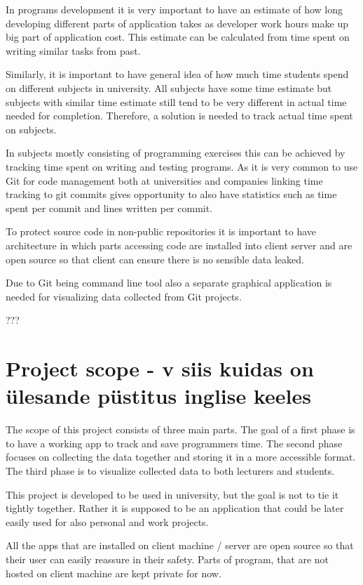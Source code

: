 In programs development it is very important to have an estimate of how long developing different parts of application takes as
developer work hours make up big part of application cost.
This estimate can be calculated from time spent on writing similar tasks from past.

Similarly, it is important to have general idea of how much time students spend on different subjects in university.
All subjects have some time estimate but subjects with similar time estimate still tend to be very different in actual
time needed for completion.
Therefore, a solution is needed to track actual time spent on subjects.

In subjects mostly consisting of programming exercises this can be achieved by tracking time spent on writing and testing programs.
As it is very common to use Git for code management both at universities and companies linking time tracking to git commits
gives opportunity to also have statistics such as time spent per commit and lines written per commit.

To protect source code in non-public repositories it is important to have architecture in which parts accessing code are
installed into client server and are open source so that client can ensure there is no sensible data leaked.

Due to Git being command line tool also a separate graphical application is needed for visualizing data collected
from Git projects.

???

\section{Project scope - v siis kuidas on ülesande püstitus inglise keeles}\label{sec:project-scope}
The scope of this project consists of three main parts.
The goal of a first phase is to have a working app to track and save programmers time.
The second phase focuses on collecting the data together and storing it in a more accessible format.
The third phase is to visualize collected data to both lecturers and students.

This project is developed to be used in university, but the goal is not to tie it tightly together.
Rather it is supposed to be an application that could be later easily used for also personal and work projects.

All the apps that are installed on client machine / server are open source so that their user can easily reassure in their safety.
Parts of program, that are not hosted on client machine are kept private for now.